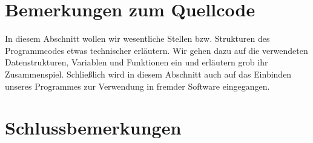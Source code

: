 \documentclass[12pt,a4paper]{article}
\begin{document}
\section{Bemerkungen zum Quellcode}
In diesem Abschnitt wollen wir wesentliche Stellen bzw. Strukturen des Programmcodes etwas technischer erläutern. Wir gehen dazu auf die verwendeten Datenstrukturen, Variablen und Funktionen ein und erläutern grob ihr Zusammenspiel. Schließlich wird in diesem Abschnitt auch auf das Einbinden unseres Programmes zur Verwendung in fremder Software eingegangen.
	
	
	
%
%
\clearpage
\section{Schlussbemerkungen}

\newpage
\printbibliography
\end{document}

